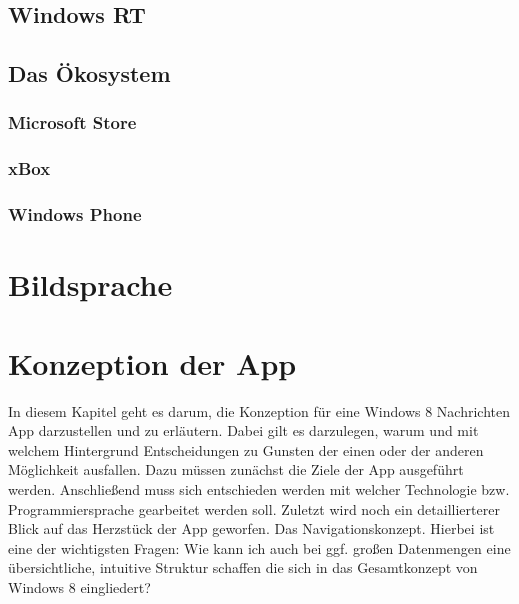 \documentclass[12pt,a4paper]{scrartcl}
\begin{document}
\subsection{Windows RT}
\label{subsec:winRT}
\subsection{Das Ökosystem}
\label{subsec:ökosystem}
\subsubsection{Microsoft Store}
\label{subsubsec:store}
\subsubsection{xBox}
\label{subsubsec:xbox}
\subsubsection{Windows Phone}
\label{subsubsec:windowsphone}

\newpage
\section{Bildsprache}

\newpage
\section{Konzeption der App}
\label{sec:konzeption}
In diesem Kapitel geht es darum, die Konzeption für eine Windows 8 Nachrichten App darzustellen und zu erläutern. Dabei gilt es darzulegen, warum und mit welchem Hintergrund Entscheidungen zu Gunsten der einen oder der anderen Möglichkeit ausfallen. Dazu müssen zunächst die Ziele der App ausgeführt werden. Anschließend muss sich entschieden werden mit welcher Technologie bzw. Programmiersprache gearbeitet werden soll. Zuletzt wird noch ein detaillierterer Blick auf das Herzstück der App geworfen. Das Navigationskonzept. Hierbei ist eine der wichtigsten Fragen: \glqq Wie kann ich auch bei ggf. großen Datenmengen eine übersichtliche, intuitive Struktur schaffen die sich in das Gesamtkonzept von Windows 8 eingliedert?\grqq  
\end{document}

